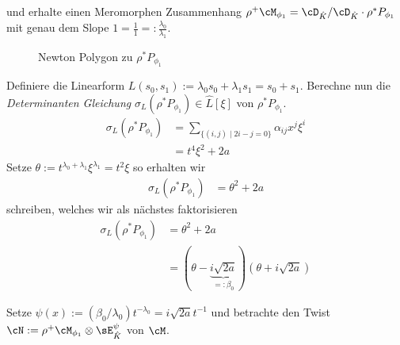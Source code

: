 \fi
und erhalte einen Meromorphen Zusammenhang $\rho^+\cM_{\phi_1}=\cD_{\hat
K}/\cD_{\hat K}\cdot\rho^*P_{\phi_1}$ mit genau dem Slope
$1=\frac{1}{1}=:\frac{\lambda_0}{\lambda_1}$.
\begin{figure}[H]
\caption{Newton Polygon zu $\rho^*P_{\phi_1}$}
\begin{center}
\end{center}
\end{figure}

\begin{comment}
TODO: Namenskollision: $\hat L$ und $L(s_0,s_1)$.
\end{comment}
Definiere die Linearform $L(s_0,s_1):=\lambda_0s_0+\lambda_1s_1=s_0+s_1$.
Berechne nun die \emph{Determinanten Gleichung} $\sigma_L(\rho^*P_{\phi_1})\in
\hat L[\xi]$ von $\rho^*P_{\phi_1}$.
\begin{align*}
\sigma_L(\rho^*P_{\phi_1})
  &= \sum_{\{(i,j)\mid 2i-j=0\}}\alpha_{ij}x^{j}\xi^i\\
  &= t^4\xi^2 + 2a
\end{align*}
Setze $\theta:=t^{\lambda_0+\lambda_1}\xi^{\lambda_1}=t^2\xi$ so erhalten wir
\begin{align*}
\sigma_L(\rho^*P_{\phi_1}) &= \theta^2 + 2a
\end{align*}
schreiben, welches wir als nächstes faktorisieren
\begin{align*}
\sigma_L(\rho^*P_{\phi_1}) &= \theta^2+2a\\
  &=(\theta-\underset{=:\beta_0}{\underbrace{i\sqrt{2a}}})
    (\theta+i\sqrt{2a})
\end{align*}
\begin{comment}
Definiere $R(t):=(\beta_0/(\lambda_0+1))t^{\lambda_0+1}=i\sqrt{2a}t^2$ und wir
wollen ein $\psi(t)$ so dass 
\[
\frac{\partial R(t^{-1})}{\partial t} = \psi'(t)
\]
erhalte $\psi'(x)=\beta_0(x^{-1})^{\lambda_0}$
\end{comment}
\begin{comment}
TODO: korregiere allgemeinen Part, falls richtig!
\end{comment}
Setze $\psi(x):=(\beta_0/\lambda_0)t^{-\lambda_0}=i\sqrt{2a}t^{-1}$ und
betrachte den Twist $\cN:=\rho^+\cM_{\phi_1}\otimes\sE_{\hat K}^\psi$ von
$\cM$.
